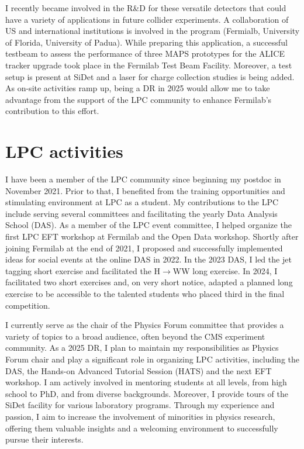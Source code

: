 {\begin{flushleft}
I recently became involved in the R\&D for these versatile detectors that could have a variety of applications in future collider experiments. A collaboration of US and international institutions is involved in the program (Fermialb, University of Florida, University of Padua). While preparing this application, a successful testbeam to assess the performance of three MAPS prototypes for the ALICE tracker upgrade took place in the Fermilab Test Beam Facility. Moreover, a test setup is present at SiDet and a laser for charge  collection studies is being added.
As on-site activities ramp up, being a DR in 2025 would allow me to take advantage from the support of the LPC community to enhance Fermilab's contribution to this effort.

 
\section{LPC activities}
\vspace{\baselineskip}
I have been a member of the LPC community since beginning my postdoc in November 2021. Prior to that, I benefited from the training opportunities and stimulating environment at LPC as a student.
My contributions to the LPC include serving several committees and facilitating the yearly Data Analysis School (DAS). 
As a member of the LPC event committee, I helped organize the first LPC EFT workshop at Fermilab and the Open Data workshop. 
Shortly after joining Fermilab at the end of 2021, I proposed and successfully implemented ideas for social events at the online DAS in 2022.
In the 2023 DAS, I led the jet tagging short exercise and facilitated the H$\to$WW long exercise. In 2024, I facilitated two short exercises and, on very short notice, adapted a planned long exercise to be accessible to the talented students who placed third in the final competition.

I currently serve as the chair of the Physics Forum committee that provides a variety of topics to a broad audience, often beyond the CMS experiment community. As a 2025 DR, I plan to maintain my responsibilities as Physics Forum chair and play a significant role in organizing LPC activities, including the DAS, the Hands-on Advanced Tutorial Session (HATS) and the next EFT workshop. I am actively involved in mentoring students at all levels, from high school to PhD, and from diverse backgrounds. Moreover, I provide tours of the SiDet facility for various laboratory programs. Through my experience and passion, I aim to increase the involvement of minorities in physics research, offering them valuable insights and a welcoming environment to successfully pursue their interests.




\end{flushleft}}
